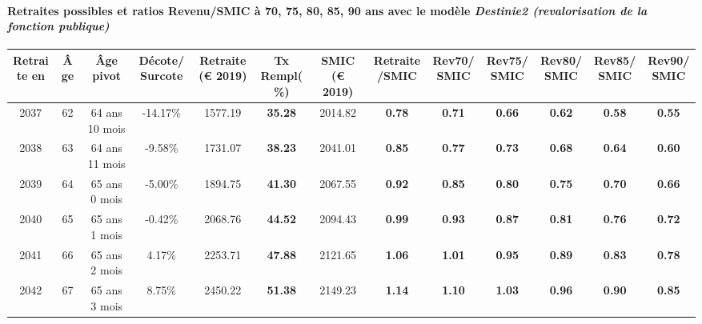 \paragraph{Retraites possibles et ratios Revenu/SMIC à 70, 75, 80, 85, 90 ans avec le modèle \emph{Destinie2 (revalorisation de la fonction publique)}}  
 
{ \scriptsize \begin{center} 
\begin{tabular}[htb]{|c|c||c|c||c|c||c||c|c|c|c|c|c|} 
\hline 
 Retraite en &  Âge &  Âge pivot &  Décote/Surcote &  Retraite (\euro{} 2019) &  Tx Rempl(\%) &  SMIC (\euro{} 2019) &  Retraite/SMIC &  Rev70/SMIC &  Rev75/SMIC &  Rev80/SMIC &  Rev85/SMIC &  Rev90/SMIC \\ 
\hline \hline 
 2037 &  62 &  64 ans 10 mois &  -14.17\% &  1577.19 &  {\bf 35.28} &  2014.82 &  {\bf {\color{red} 0.78}} &  {\bf {\color{red} 0.71}} &  {\bf {\color{red} 0.66}} &  {\bf {\color{red} 0.62}} &  {\bf {\color{red} 0.58}} &  {\bf {\color{red} 0.55}} \\ 
\hline 
 2038 &  63 &  64 ans 11 mois &  -9.58\% &  1731.07 &  {\bf 38.23} &  2041.01 &  {\bf {\color{red} 0.85}} &  {\bf {\color{red} 0.77}} &  {\bf {\color{red} 0.73}} &  {\bf {\color{red} 0.68}} &  {\bf {\color{red} 0.64}} &  {\bf {\color{red} 0.60}} \\ 
\hline 
 2039 &  64 &  65 ans 0 mois &  -5.00\% &  1894.75 &  {\bf 41.30} &  2067.55 &  {\bf {\color{red} 0.92}} &  {\bf {\color{red} 0.85}} &  {\bf {\color{red} 0.80}} &  {\bf {\color{red} 0.75}} &  {\bf {\color{red} 0.70}} &  {\bf {\color{red} 0.66}} \\ 
\hline 
 2040 &  65 &  65 ans 1 mois &  -0.42\% &  2068.76 &  {\bf 44.52} &  2094.43 &  {\bf {\color{red} 0.99}} &  {\bf {\color{red} 0.93}} &  {\bf {\color{red} 0.87}} &  {\bf {\color{red} 0.81}} &  {\bf {\color{red} 0.76}} &  {\bf {\color{red} 0.72}} \\ 
\hline 
 2041 &  66 &  65 ans 2 mois &  4.17\% &  2253.71 &  {\bf 47.88} &  2121.65 &  {\bf 1.06} &  {\bf 1.01} &  {\bf {\color{red} 0.95}} &  {\bf {\color{red} 0.89}} &  {\bf {\color{red} 0.83}} &  {\bf {\color{red} 0.78}} \\ 
\hline 
 2042 &  67 &  65 ans 3 mois &  8.75\% &  2450.22 &  {\bf 51.38} &  2149.23 &  {\bf 1.14} &  {\bf 1.10} &  {\bf 1.03} &  {\bf {\color{red} 0.96}} &  {\bf {\color{red} 0.90}} &  {\bf {\color{red} 0.85}} \\ 
\hline 
\hline 
\end{tabular} 
\end{center} } 

